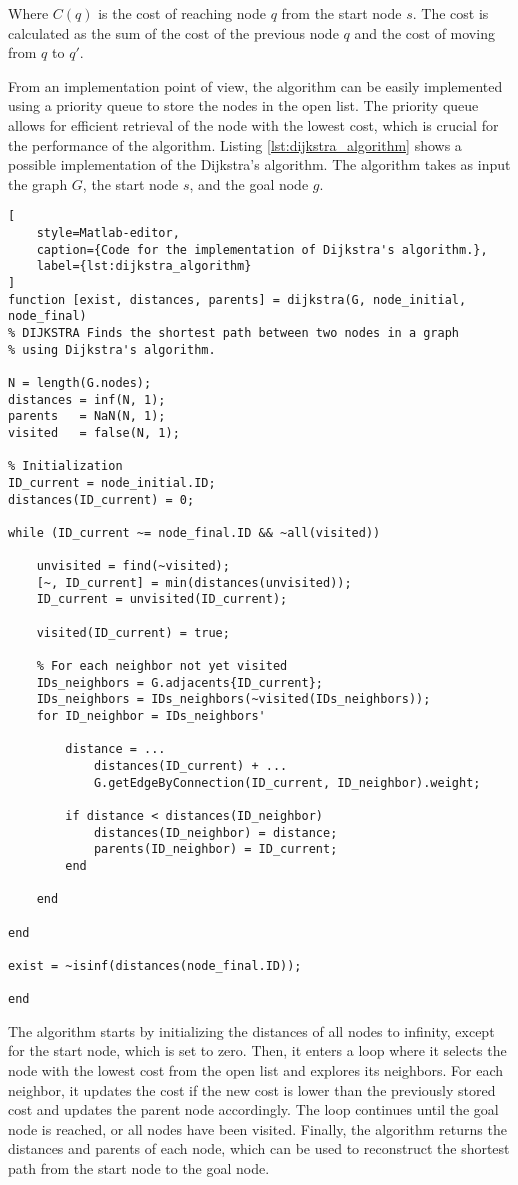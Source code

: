 Where $C(q)$ is the cost of reaching node $q$ from the start node $s$.
The cost is calculated as the sum of the cost of the previous node $q$ and the cost of moving from $q$ to $q'$.

From an implementation point of view, the algorithm can be easily implemented using a priority queue to store the nodes in the open list.
The priority queue allows for efficient retrieval of the node with the lowest cost, which is crucial for the performance of the algorithm.
Listing \ref{lst:dijkstra_algorithm} shows a possible implementation of the Dijkstra's algorithm.
The algorithm takes as input the graph $G$, the start node $s$, and the goal node $g$.

\begin{lstlisting}[
    style=Matlab-editor,
    caption={Code for the implementation of Dijkstra's algorithm.},
    label={lst:dijkstra_algorithm}
]
function [exist, distances, parents] = dijkstra(G, node_initial, node_final)
% DIJKSTRA Finds the shortest path between two nodes in a graph
% using Dijkstra's algorithm.

N = length(G.nodes);
distances = inf(N, 1);
parents   = NaN(N, 1);
visited   = false(N, 1);

% Initialization
ID_current = node_initial.ID;
distances(ID_current) = 0;

while (ID_current ~= node_final.ID && ~all(visited))

    unvisited = find(~visited);
    [~, ID_current] = min(distances(unvisited));
    ID_current = unvisited(ID_current);

    visited(ID_current) = true;

    % For each neighbor not yet visited
    IDs_neighbors = G.adjacents{ID_current};
    IDs_neighbors = IDs_neighbors(~visited(IDs_neighbors));
    for ID_neighbor = IDs_neighbors'

        distance = ...
            distances(ID_current) + ...
            G.getEdgeByConnection(ID_current, ID_neighbor).weight;

        if distance < distances(ID_neighbor)
            distances(ID_neighbor) = distance;
            parents(ID_neighbor) = ID_current;
        end

    end

end

exist = ~isinf(distances(node_final.ID));

end
\end{lstlisting}

The algorithm starts by initializing the distances of all nodes to infinity, except for the start node, which is set to zero.
Then, it enters a loop where it selects the node with the lowest cost from the open list and explores its neighbors.
For each neighbor, it updates the cost if the new cost is lower than the previously stored cost and updates the parent node accordingly.
The loop continues until the goal node is reached, or all nodes have been visited.
Finally, the algorithm returns the distances and parents of each node, which can be used to reconstruct the shortest path from the start node to the goal node.



